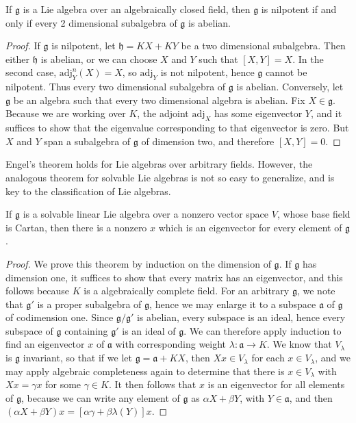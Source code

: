 \begin{corollary}
    If $\mathfrak{g}$ is a Lie algebra over an algebraically closed field, then $\mathfrak{g}$ is nilpotent if and only if every 2 dimensional subalgebra of $\mathfrak{g}$ is abelian.
\end{corollary}
\begin{proof}
    If $\mathfrak{g}$ is nilpotent, let $\mathfrak{h} = KX + KY$ be a two dimensional subalgebra. Then either $\mathfrak{h}$ is abelian, or we can choose $X$ and $Y$ such that $[X,Y] = X$. In the second case, $\text{adj}^n_Y(X) = X$, so $\text{adj}_Y$ is not nilpotent, hence $\mathfrak{g}$ cannot be nilpotent. Thus every two dimensional subalgebra of $\mathfrak{g}$ is abelian. Conversely, let $\mathfrak{g}$ be an algebra such that every two dimensional algebra is abelian. Fix $X \in \mathfrak{g}$. Because we are working over $K$, the adjoint $\text{adj}_X$ has some eigenvector $Y$, and it suffices to show that the eigenvalue corresponding to that eigenvector is zero. But $X$ and $Y$ span a subalgebra of $\mathfrak{g}$ of dimension two, and therefore $[X,Y] = 0$.
\end{proof}

Engel's theorem holds for Lie algebras over arbitrary fields. However, the analogous theorem for solvable Lie algebras is not so easy to generalize, and is key to the classification of Lie algebras.

\begin{lemma}
    If $\mathfrak{g}$ is a solvable linear Lie algebra over a nonzero vector space $V$, whose base field is Cartan, then there is a nonzero $x$ which is an eigenvector for every element of $\mathfrak{g}$.
\end{lemma}
\begin{proof}
    We prove this theorem by induction on the dimension of $\mathfrak{g}$. If $\mathfrak{g}$ has dimension one, it suffices to show that every matrix has an eigenvector, and this follows because $K$ is a algebraically complete field. For an arbitrary $\mathfrak{g}$, we note that $\mathfrak{g}'$ is a proper subalgebra of $\mathfrak{g}$, hence we may enlarge it to a subspace $\mathfrak{a}$ of $\mathfrak{g}$ of codimension one. Since $\mathfrak{g}/\mathfrak{g}'$ is abelian, every subspace is an ideal, hence every subspace of $\mathfrak{g}$ containing $\mathfrak{g}'$ is an ideal of $\mathfrak{g}$. We can therefore apply induction to find an eigenvector $x$ of $\mathfrak{a}$ with corresponding weight $\lambda: \mathfrak{a} \to K$. We know that $V_\lambda$ is $\mathfrak{g}$ invariant, so that if we let $\mathfrak{g} = \mathfrak{a} + KX$, then $Xx \in V_\lambda$ for each $x \in V_\lambda$, and we may apply algebraic completeness again to determine that there is $x \in V_\lambda$ with $Xx = \gamma x$ for some $\gamma \in K$. It then follows that $x$ is an eigenvector for all elements of $\mathfrak{g}$, because we can write any element of $\mathfrak{g}$ as $\alpha X + \beta Y$, with $Y \in \mathfrak{a}$, and then $(\alpha X + \beta Y)x = [\alpha \gamma + \beta \lambda(Y)]x$.
\end{proof}

